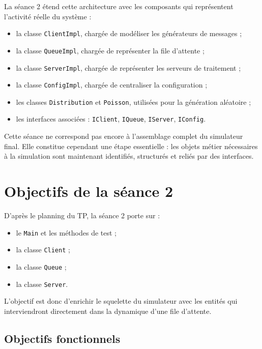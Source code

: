 \documentclass{article}
\begin{document}
La séance 2 étend cette architecture avec les composants qui représentent l’activité réelle du système :
\begin{itemize}[leftmargin=*]
    \item la classe \texttt{ClientImpl}, chargée de modéliser les générateurs de messages ;
    \item la classe \texttt{QueueImpl}, chargée de représenter la file d’attente ;
    \item la classe \texttt{ServerImpl}, chargée de représenter les serveurs de traitement ;
    \item la classe \texttt{ConfigImpl}, chargée de centraliser la configuration ;
    \item les classes \texttt{Distribution} et \texttt{Poisson}, utilisées pour la génération aléatoire ;
    \item les interfaces associées : \texttt{IClient}, \texttt{IQueue}, \texttt{IServer}, \texttt{IConfig}.
\end{itemize}

Cette séance ne correspond pas encore à l’assemblage complet du simulateur final. Elle constitue cependant une étape essentielle : les objets métier nécessaires à la simulation sont maintenant identifiés, structurés et reliés par des interfaces.

\section{Objectifs de la séance 2}

D’après le planning du TP, la séance 2 porte sur :
\begin{itemize}[leftmargin=*]
    \item le \texttt{Main} et les méthodes de test ;
    \item la classe \texttt{Client} ;
    \item la classe \texttt{Queue} ;
    \item la classe \texttt{Server}.
\end{itemize}

L’objectif est donc d’enrichir le squelette du simulateur avec les entités qui interviendront directement dans la dynamique d’une file d’attente.

\subsection{Objectifs fonctionnels}
\end{document}
